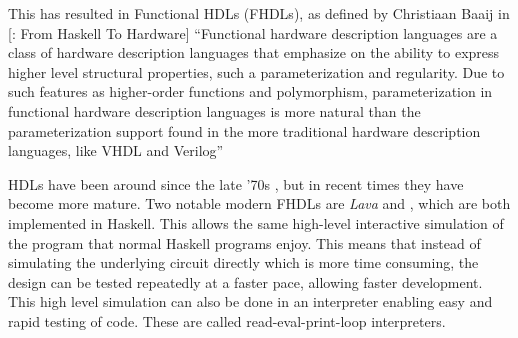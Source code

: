 		This has resulted in Functional HDLs (FHDLs), as defined by Christiaan 
		Baaij in [\clash: From Haskell To Hardware] ``Functional hardware
		description languages are a class of hardware description languages
		that emphasize on the ability to express higher level structural
		properties, such a parameterization and regularity. Due to such
		features as higher-order functions and polymorphism, parameterization
		in functional hardware description languages is more natural than the
		parameterization support found in the more traditional hardware
		description languages, like VHDL and Verilog'' \cite{Baaij2009}
		
		\label{FHDLs}
		HDLs have been around since the late '70s \cite{Chen2012}, but in
		recent times they have become more mature\cite{Chen2012}. Two notable
		modern FHDLs are \emph{Lava} and \clash \cite{Baaij2009, Bjesse1998},
		which are both implemented in Haskell. This allows the same
		high-level interactive simulation of the program that normal Haskell
		programs enjoy. This means that instead of simulating the underlying
		circuit directly which is more time consuming, the design can be
		tested repeatedly at a faster pace, allowing faster development. This
		high level simulation can also be done in an interpreter enabling
		easy and rapid testing of code. These are called read-eval-print-loop
		interpreters.
